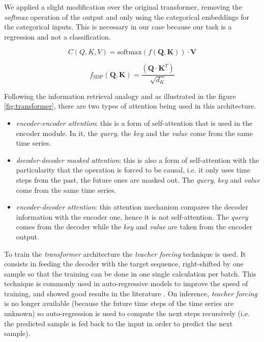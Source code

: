 \documentclass{elsarticle}
\begin{document}
	We applied a slight modification over the original transformer, removing the \textit{softmax} operation of the output and only using the categorical embeddings for the categorical inputs. This is necessary in our case because our task is a regression and not a classification.
	
	\begin{equation}
	C(Q,K,V) = \text{softmax}(f(\mathbf{Q}, \mathbf{K})) \cdot \mathbf{V}
	\label{eq:att}
	\end{equation}
	
	\begin{equation}
	f_{\text{SDP}}(\mathbf{Q}, \mathbf{K}) = \frac{(\mathbf{Q} \cdot \mathbf{K}^T)} {\sqrt {d_K}}
	\label{eq:scaled_dot_product}
	\end{equation}
	
	Following the information retrieval analogy and as illustrated in the figure \ref{fig:transformer}, there are two types of attention being used in this architecture.
	\begin{itemize}
		\item \textit{encoder-encoder attention}: this is a form of self-attention that is used in the encoder module. In it, the \textit{query}, the \textit{key} and the \textit{value} come from the same time series.
		\item \textit{decoder-decoder masked attention}: this is also a form of self-attention with the particularity that the operation is forced to be causal, i.e. it only uses time steps from the past, the future ones are masked out. The \textit{query}, \textit{key} and \textit{value} come from the same time series.
		\item \textit{encoder-decoder attention}: this attention mechanism compares the decoder information with the encoder one, hence it is not self-attention. The \textit{query} comes from the decoder while the \textit{key} and \textit{value} are taken from the encoder output.
	\end{itemize}
	
	To train the \textit{transformer} architecture the \textit{teacher forcing} technique \cite{williams1989, goyal2016} is used. It consists in feeding the decoder with the target sequence, right-shifted by one sample so that the training can be done in one single calculation per batch. This technique is commonly used in auto-regressive models to improve the speed of training, and showed good results in the literature \cite{vaswani2017}. On inference, \textit{teacher forcing} is no longer available (because the future time steps of the time series are unknown) so auto-regression is used to compute the next steps recursively (i.e. the predicted sample is fed back to the input in order to predict the next sample).
    
\end{document}
